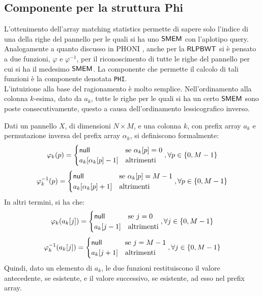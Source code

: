 \subsection{Componente per la struttura Phi}
\label{secphi}
L'ottenimento dell'array matching statistics permette di sapere solo
l'indice di una della righe del pannello per le quali si ha uno $\mbox{\rm {\sf SMEM}}$ con
l'aplotipo query. Analogamente a quanto discusso in PHONI \cite{phoni},
anche per la $\mbox{\rm {\sf RLPBWT}}$ si è pensato a due funzioni, $\varphi$ e
$\varphi^{-1}$, per il riconoscimento di tutte le
righe del pannello per cui si ha il medesimo $\mbox{\rm {\sf SMEM}}$. La componente che permette
il calcolo 
di tali funzioni è la componente denotata \texttt{PHI}.\\
L'intuizione alla base del ragionamento è molto semplice. Nell'ordinamento alla
colonna $k$-esima, dato da $a_k$, tutte le righe per le quali si ha un certo
$\mbox{\rm {\sf SMEM}}$ sono poste consecutivamente, questo a causa dell'ordinamento
lessicografico inverso.
\begin{definizione}
  Dati un pannello $X$, di dimensioni $N\times M$, e una colonna $k$, con
  prefix array $a_k$ e permutazione inversa del prefix array $\alpha_k$, si
  definiscono formalmente: 
  \[\varphi_k(p)=
    \begin{cases}
      \mbox{\rm {\sf null}}&\mbox{se }\alpha_k[p]=0\\
      a_k[\alpha_k[p]-1]&\mbox{altrimenti}
    \end{cases},\forall p\in\{0,M-1\}
  \]
  \[\varphi^{-1}_k(p)=
    \begin{cases}
      \mbox{\rm {\sf null}}&\mbox{se }\alpha_k[p]=M-1\\
      a_k[\alpha_k[p]+1]&\mbox{altrimenti}
    \end{cases},\forall p\in\{0,M-1\}
  \]
  In altri termini, si ha che:
  \[\varphi_k(a_k[j])=
    \begin{cases}
     \mbox{\rm {\sf null}}&\mbox{se }j=0\\
      a_k[j-1]&\mbox{altrimenti}
    \end{cases},\forall j\in\{0,M-1\}
  \]
  \[\varphi^{-1}_k(a_k[j])=
    \begin{cases}
      \mbox{\rm {\sf null}}&\mbox{se }j=M-1\\
      a_k[j+1]&\mbox{altrimenti}
    \end{cases},\forall j\in\{0,M-1\}
  \]
  Quindi, dato un elemento di $a_k$, le due funzioni restituiscono il valore
  antecedente, se esistente, e il valore successivo, se esistente, ad esso nel
  prefix array.
\end{definizione}
